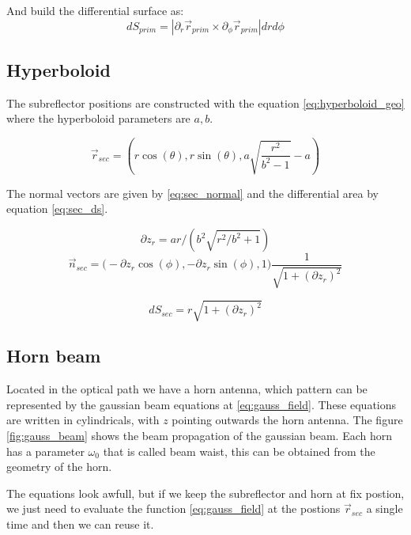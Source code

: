 And build the differential surface as:
\begin{equation}
    dS_{prim} = |\partial_r\vec{r}_{prim}  \times \partial_{\phi}\vec{r}_{prim}| dr d\phi
\end{equation}




\subsection{Hyperboloid}

The subreflector positions are constructed with the equation \ref{eq:hyperboloid_geo} where the hyperboloid parameters are $a,b$.

\begin{equation}
    \vec{r}_{sec} = \left(r\cos(\theta), r\sin(\theta), a \sqrt{\frac{r^2}{b^2-1}}-a  \right)
    \label{eq:hyperboloid_geo}
\end{equation}

The normal vectors are given by \ref{eq:sec_normal} and the differential area by equation \ref{eq:sec_ds}.

\begin{equation}
    \partial z_r = ar/(b^2 \sqrt{r^2/b^2+1})
\end{equation}
\begin{equation}
    \vec{n}_{sec} = \big(-\partial z_r \cos(\phi), -\partial z_r \sin(\phi), 1 \big) \frac{1}{\sqrt{1+(\partial z_r)^2}}
    \label{eq:sec_normal}
\end{equation}


\begin{equation}
    dS_{sec} = r\sqrt{1+(\partial z_r)^2}
    \label{eq:sec_ds}
\end{equation}


\subsection{Horn beam}

Located in the optical path we have a horn antenna, which pattern can be represented by the gaussian beam equations at \ref{eq:gauss_field}. These equations are written in cylindricals, with $z$ pointing outwards the horn antenna. The figure \ref{fig:gauss_beam} shows the beam propagation of the gaussian beam.
Each horn has a parameter $\omega_0$ that is called beam waist, this can be obtained from the geometry of the horn.


The equations look awfull, but if we keep the subreflector and horn at fix postion, we just need to evaluate the function \ref{eq:gauss_field} at the postions $\vec{r}_{sec}$ a single time and then we can reuse it.

